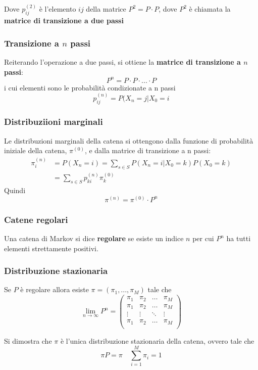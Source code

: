Dove \(p_{ij}^{(2)}\) è l'elemento \(ij\) della matrice \(P^2 = P \cdot P\), dove \(P^2\) è chiamata la \textbf{matrice di transizione a due passi}

\subsubsection{Transizione a \(n\) passi}
Reiterando l’operazione a due passi, si ottiene la \textbf{matrice di transizione a \(n\) passi}:
\[P^n = P \cdot P \cdot ... \cdot P\]
i cui elementi sono le probabilità condizionate a n passi
\[p_{ij}^{(n)} = P(X_n = j | X_0 = i\]

\subsubsection{Distribuziioni marginali}
Le distribuzioni marginali della catena si ottengono dalla funzione di probabilità iniziale della catena, \(\pi^{(0)}\), e dalla matrice di transizione a n passi:
\begin{align*}
\pi_i^{(n)} &= P(X_n = i) = \sum_{s \in S} P(X_n = i | X_0 = k)P(X_0 = k)\\
&= \sum_{s \in S}p_{ki}^{(n)}\pi_k^{(0)}
\end{align*}
Quindi
\[\pi^{(n)} = \pi^{(0)} \cdot P^n\]

\subsubsection{Catene regolari}
\begin{tcolorbox}
Una catena di Markov si dice \textbf{regolare} se esiste un indice \(n\) per cui \(P^n\) ha tutti elementi strettamente positivi.
\end{tcolorbox}

\subsubsection{Distribuzione stazionaria}
Se \(P\) è regolare allora esiste \(\pi = (\pi_1, . . . , \pi_M)\) tale che
\[
\lim_{n \rightarrow \infty}P^n = \begin{pmatrix}
\pi_{1} & \pi_{2} & \hdots & \pi_{M}\\
\pi_{1} & \pi_{2} & \hdots & \pi_{M}\\
\vdots & \vdots & \ddots & \vdots\\
\pi_{1} & \pi_{2} & \hdots & \pi_{M}\\
\end{pmatrix}
\]
\begin{tcolorbox}
Si dimostra che \(\pi\) è l’unica distribuzione stazionaria della catena, ovvero tale che
\[\pi P = \pi \quad \sum_{i = 1}^M \pi_i = 1\]
\end{tcolorbox}

